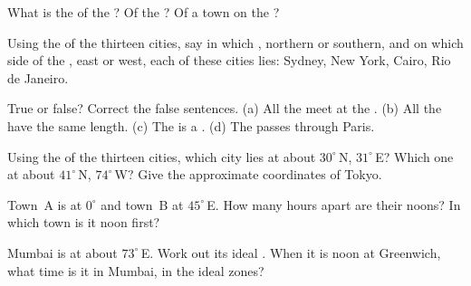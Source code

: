 \begin{exercise}[$\star$]\label{exo:g6:latitude-longitude:2}
What is the  of the ? Of the ? Of a town on the
?
\end{exercise}

\begin{exercise}[$\star$]\label{exo:g6:latitude-longitude:3}
Using the  of the thirteen cities, say in which , northern or
southern, and on which side of the , east or west, each of
these cities lies: Sydney, New York, Cairo, Rio de Janeiro.
\end{exercise}

\begin{exercise}[$\star$]\label{exo:g6:latitude-longitude:4}
True or false? Correct the false sentences.
(a) All the  meet at the .
(b) All the  have the same length.
(c) The  is a .
(d) The  passes through Paris.
\end{exercise}

\begin{exercise}[$\star\star$]\label{exo:g6:latitude-longitude:5}
Using the  of the thirteen cities, which city lies at about
$30^\circ$\,N, $31^\circ$\,E? Which one at about $41^\circ$\,N,
$74^\circ$\,W? Give the approximate coordinates of Tokyo.
\end{exercise}

\begin{exercise}[$\star\star$]\label{exo:g6:latitude-longitude:6}
Town~A is at  $0^\circ$ and town~B at  $45^\circ$\,E.
How many hours apart are their noons? In which town is it noon first?
\end{exercise}

\begin{exercise}[$\star\star$]\label{exo:g6:latitude-longitude:7}
Mumbai is at about $73^\circ$\,E. Work out its ideal . When it is
noon at Greenwich, what time is it in Mumbai, in the ideal zones?
\end{exercise}

